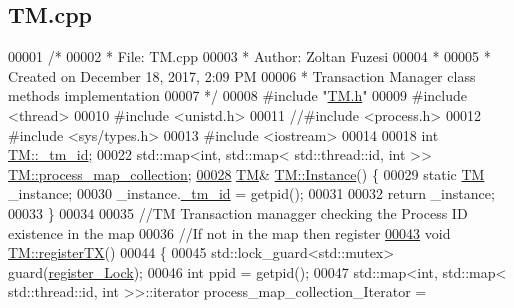 \hypertarget{_t_m_8cpp_source}{}\subsection{T\+M.\+cpp}

\begin{DoxyCode}
00001 \textcolor{comment}{/* }
00002 \textcolor{comment}{ * File:   TM.cpp}
00003 \textcolor{comment}{ * Author: Zoltan Fuzesi}
00004 \textcolor{comment}{ * }
00005 \textcolor{comment}{ * Created on December 18, 2017, 2:09 PM}
00006 \textcolor{comment}{ * Transaction Manager class methods implementation}
00007 \textcolor{comment}{ */}
00008 \textcolor{preprocessor}{#include "\hyperlink{_t_m_8h}{TM.h}"}
00009 \textcolor{preprocessor}{#include <thread>}
00010 \textcolor{preprocessor}{#include <unistd.h>}
00011 \textcolor{comment}{//#include <process.h>}
00012 \textcolor{preprocessor}{#include <sys/types.h>}
00013 \textcolor{preprocessor}{#include <iostream>}
00014 
00018 \textcolor{keywordtype}{int} \hyperlink{class_t_m_a6fb90615393f9205838e302c714bbd60_a6fb90615393f9205838e302c714bbd60}{TM::\_tm\_id};
00022 std::map<int, std::map< std::thread::id, int >> \hyperlink{class_t_m_a81c3bd28ad2343a620fa070f8ac186ca_a81c3bd28ad2343a620fa070f8ac186ca}{TM::process\_map\_collection};
\hypertarget{_t_m_8cpp_source.tex_l00028}{}\hyperlink{class_t_m_a7ce5f35e0dae76df4fe116cf905bbe60_a7ce5f35e0dae76df4fe116cf905bbe60}{00028} \hyperlink{class_t_m}{TM}& \hyperlink{class_t_m_a7ce5f35e0dae76df4fe116cf905bbe60_a7ce5f35e0dae76df4fe116cf905bbe60}{TM::Instance}() \{
00029     \textcolor{keyword}{static} \hyperlink{class_t_m}{TM} \_instance;
00030     \_instance.\hyperlink{class_t_m_a6fb90615393f9205838e302c714bbd60_a6fb90615393f9205838e302c714bbd60}{\_tm\_id} = getpid();
00031 
00032     \textcolor{keywordflow}{return} \_instance;
00033 \}
00034 
00035 \textcolor{comment}{//TM Transaction managger checking the Process ID existence in the map}
00036 \textcolor{comment}{//If not in the map then register}
\hypertarget{_t_m_8cpp_source.tex_l00043}{}\hyperlink{class_t_m_a26ea481c24d9aa3aebd6dafb7253376e_a26ea481c24d9aa3aebd6dafb7253376e}{00043} \textcolor{comment}{}\textcolor{keywordtype}{void} \hyperlink{class_t_m_a26ea481c24d9aa3aebd6dafb7253376e_a26ea481c24d9aa3aebd6dafb7253376e}{TM::registerTX}()
00044 \{
00045     std::lock\_guard<std::mutex> guard(\hyperlink{class_t_m_aeb26546681bfe64e21606b8c012bb8c3_aeb26546681bfe64e21606b8c012bb8c3}{register\_Lock});
00046     \textcolor{keywordtype}{int} ppid = getpid();
00047     std::map<int, std::map< std::thread::id, int >>::iterator process\_map\_collection\_Iterator = 

\end{DoxyCode}
